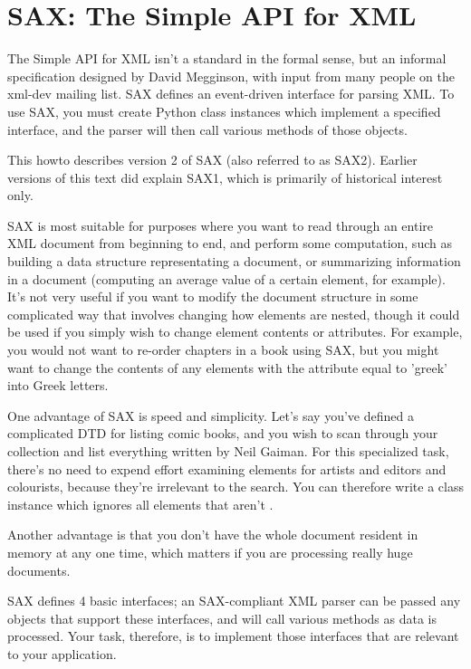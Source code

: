 \documentclass{howto}
\newcommand{\element}[1]{\code{#1}}
\newcommand{\attribute}[1]{\code{#1}}
\begin{document}
\section{SAX: The Simple API for XML}
\label{SAX}

The Simple API for XML isn't a standard in the formal sense, but an
informal specification designed by David Megginson, with input from
many people on the xml-dev mailing list.  SAX defines an event-driven
interface for parsing XML.  To use SAX, you must create Python class
instances which implement a specified interface, and the parser will
then call various methods of those objects.

This howto describes version 2 of SAX (also referred to as
SAX2). Earlier versions of this text did explain SAX1, which is
primarily of historical interest only.

SAX is most suitable for purposes where you want to read through an
entire XML document from beginning to end, and perform some
computation, such as building a data structure representating a
document, or summarizing information in a document (computing an
average value of a certain element, for example).  It's not very
useful if you want to modify the document structure in some
complicated way that involves changing how elements are nested, though
it could be used if you simply wish to change element contents or
attributes.  For example, you would not want to re-order chapters in a
book using SAX, but you might want to change the contents of any
\element{name} elements with the attribute \attribute{lang} equal to
'greek' into Greek letters.

One advantage of SAX is speed and simplicity.  Let's say
you've defined a complicated DTD for listing comic books, and you wish
to scan through your collection and list everything written by Neil
Gaiman.  For this specialized task, there's no need to expend effort
examining elements for artists and editors and colourists, because
they're irrelevant to the search.  You can therefore write a class
instance which ignores all elements that aren't \element{writer}.

Another advantage is that you don't have the whole document resident
in memory at any one time, which matters if you are processing really
huge documents.

SAX defines 4 basic interfaces; an SAX-compliant XML parser can be
passed any objects that support these interfaces, and will call
various methods as data is processed.  Your task, therefore, is to
implement those interfaces that are relevant to your application.
\end{document}

